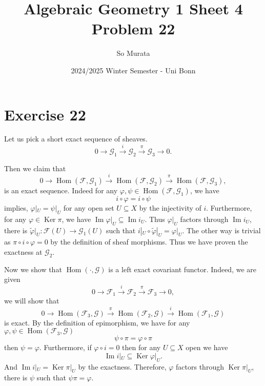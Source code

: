 \documentclass{article}
\title{Algebraic Geometry 1 Sheet 4 Problem 22}
\author{So Murata}
\date{2024/2025 Winter Semester - Uni Bonn}
\numberwithin{equation}{section}
\DeclareMathOperator{\Hom}{Hom}
\DeclareMathOperator{\Ker}{Ker}
\DeclareMathOperator{\Image}{Im}
\begin{document}
\maketitle

\section*{Exercise 22}

Let us pick a short exact sequence of sheaves.
\begin{equation*}
0\to\mathcal{G}_1\stackrel{i}{\to}\mathcal{G}_2\stackrel{\pi}{\to}\mathcal{G}_3\to0.
\end{equation*}

Then we claim that 
\begin{equation*}
0\to\Hom(\mathcal{F},\mathcal{G}_1)\stackrel{i}{\to}\Hom(\mathcal{F},\mathcal{G}_2)\stackrel{\pi}{\to}\Hom(\mathcal{F},\mathcal{G}_3),
\end{equation*}
is an exact sequence. Indeed for any $\varphi,\psi\in\Hom(\mathcal{F},\mathcal{G}_1)$, we have 
\begin{equation*}
i\circ\varphi=i\circ\psi
\end{equation*}
implies, $\varphi|_U=\psi|_U$ for any open set $U\subseteq X$ by the injectivity of $i$. Furthermore, for any $\varphi\in\Ker\pi$, we have $\Image\varphi|_U\subseteq\Image i_U$. Thus $\varphi |_U$ factors through $\Image i_U$, there is $\tilde{\varphi}|_U:\mathcal{F}(U)\to\mathcal{G}_1(U)$ such that $i|_U\circ\tilde{\varphi}|_U=\varphi|_U$. The other way is trivial as $\pi\circ i\circ\varphi=0$ by the definition of sheaf morphisms. Thus we have proven the exactness at $\mathcal{G}_2$.\\
\par Now we show that $\Hom(\cdot,\mathcal{G})$ is a left exact covariant functor. Indeed, we are given
\begin{equation*}
0\to\mathcal{F}_1\stackrel{i}{\to}\mathcal{F}_2\stackrel{\pi}{\to}\mathcal{F}_3\to0,
\end{equation*}
we will show that 
\begin{equation*}
0\to\Hom(\mathcal{F}_3,\mathcal{G})\stackrel{\pi}{\to}\Hom(\mathcal{F}_2,\mathcal{G})\stackrel{i}{\to}\Hom(\mathcal{F}_1,\mathcal{G})
\end{equation*}
is exact. By the definition of epimorphism, we have for any $\varphi,\psi\in\Hom(\mathcal{F}_3,\mathcal{G})$
\begin{equation*}
\psi\circ\pi = \varphi\circ\pi
\end{equation*}
then $\psi=\varphi$. Furthermore, if $\varphi\circ i = 0$ then for any $U\subseteq X$ open we have
\begin{equation*}
\Image i|_U\subseteq \Ker\varphi|_U.
\end{equation*}
And $\Image i|_U=\Ker\pi|_U$ by the exactness. Therefore, $\varphi$ factors through $\Ker\pi|_U$, there is $\psi$ such that $\psi\pi=\varphi$.
\end{document}
